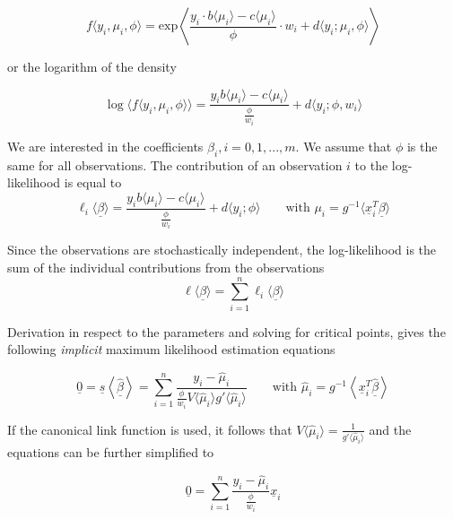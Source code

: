 \documentclass[11pt]{article}
\begin{document}
\begin{equation*}
	f\langle y_i, \mu_i, \phi\rangle = \text{exp}\left\langle\frac{y_i\cdot b\langle\mu_i\rangle - c\langle \mu_i\rangle}{\phi}\cdot w_i + d\langle y_i; \mu_i, \phi\rangle\right\rangle
\end{equation*}

or the logarithm of the density

\begin{equation*}
	\log\langle f\langle y_i, \mu_i, \phi\rangle\rangle = \frac{y_i b\langle\mu_i\rangle - c\langle\mu_i\rangle}{\frac{\phi}{w_i}} + d\langle y_i; \phi, w_i\rangle
\end{equation*}

We are interested in the coefficients $\beta_i, i=0,1,...,m$. We assume that $\phi$ is the same for all observations. The contribution of an observation $i$ to the log-likelihood is equal to
\begin{equation*}
	\ell_i \langle\underline{\beta}\rangle = \frac{y_i b\langle\mu_i\rangle - c\langle\mu_i\rangle}{\frac{\phi}{w_i}} + d\langle y_i ;\phi\rangle\qquad\text{with } \mu_i = g^{-1}\langle\underline{x}_i^T\underline{\beta}\rangle
\end{equation*}

Since the observations are stochastically independent, the log-likelihood is the sum of the individual contributions from the observations
\begin{equation*}
	\ell\langle\underline{\beta}\rangle = \sum_{i=1}^{n}\ell_i\langle\underline{\beta}\rangle
\end{equation*}

Derivation in respect to the parameters and solving for critical points, gives the following \emph{implicit} maximum likelihood estimation equations

\begin{equation*}
	\underline{0} = \underline{s}\left\langle \underline{\widehat{\beta}} \right\rangle = \sum_{i=1}^{n}\frac{y_i - \widehat{\mu}_i}{\frac{\phi}{w_i} V\langle\widehat{\mu}_i\rangle g' \langle \widehat{\mu}_i \rangle}\qquad\text{with } \widehat{\mu}_i = g^{-1}\left\langle \underline{x}_i^T \underline{\widehat{\beta}} \right\rangle
\end{equation*}

If the canonical link function is used, it follows that $ V\langle\widehat{\mu}_i\rangle = \frac{1}{g'\langle\widehat{\mu}_i\rangle}$ and the equations can be further simplified to

\begin{equation*}
\underline{0} = \sum_{i=1}^{n}\frac{y_i - \widehat{\mu}_i}{\frac{\phi}{w_i}} \underline{x}_i
\end{equation*}
\end{document}
